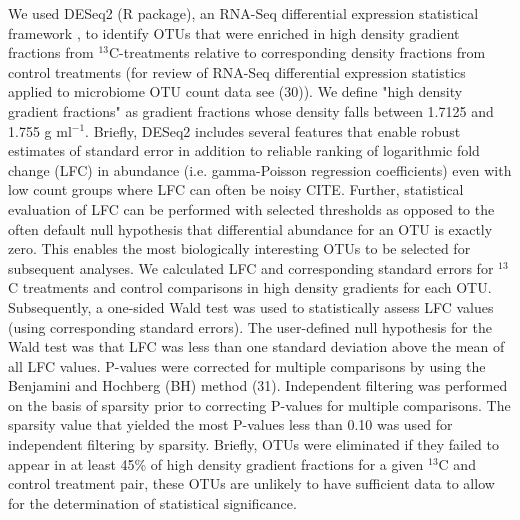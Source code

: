 We used DESeq2 (R package), an RNA-Seq differential expression statistical
framework \citep{love2014}, to identify OTUs that were enriched in high
density gradient fractions from $^{13}$C-treatments relative to corresponding
density fractions from control treatments (for review of RNA-Seq differential
expression statistics applied to microbiome OTU count data see (30)). We define
"high density gradient fractions" as gradient fractions whose density falls
between 1.7125 and 1.755 g ml$^{-1}$. Briefly, DESeq2 includes several features that
enable robust estimates of standard error in addition to reliable ranking of
logarithmic fold change (LFC) in abundance (i.e. gamma-Poisson regression
coefficients) even with low count groups where LFC can often be noisy CITE.
Further, statistical evaluation of LFC can be performed with selected
thresholds as opposed to the often default null hypothesis that differential
abundance for an OTU is exactly zero. This enables the most biologically
interesting OTUs to be selected for subsequent analyses. We calculated LFC and
corresponding standard errors for $^{13}$C treatments and control comparisons
in high density gradients for each OTU. Subsequently, a one-sided Wald test was
used to statistically assess LFC values (using corresponding standard errors).
The user-defined null hypothesis for the Wald test was that LFC was less than
one standard deviation above the mean of all LFC values. P-values were
corrected for multiple comparisons by using the Benjamini and Hochberg (BH)
method (31). Independent filtering was performed on the basis of sparsity prior
to correcting P-values for multiple comparisons. The sparsity value that
yielded the most P-values less than 0.10 was used for independent filtering by
sparsity. Briefly, OTUs were eliminated if they failed to appear in at least
45\% of high density gradient fractions for a given $^{13}$C and control
treatment pair, these OTUs are unlikely to have sufficient data to allow for
the determination of statistical significance.
